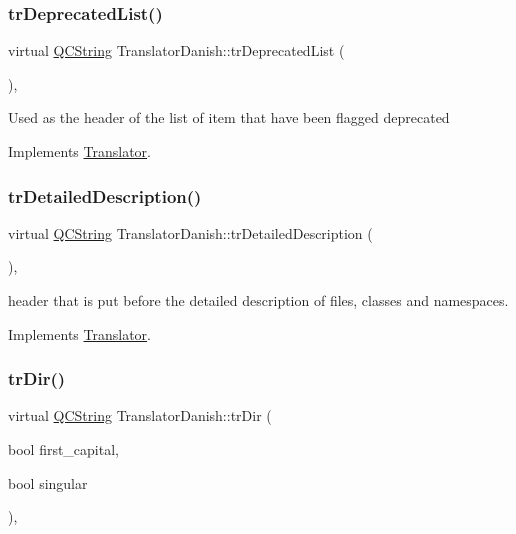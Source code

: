 \subsubsection{\texorpdfstring{trDeprecatedList()}{trDeprecatedList()}}
{\footnotesize\ttfamily virtual \mbox{\hyperlink{class_q_c_string}{Q\+C\+String}} Translator\+Danish\+::tr\+Deprecated\+List (\begin{DoxyParamCaption}{ }\end{DoxyParamCaption})\hspace{0.3cm}{\ttfamily [inline]}, {\ttfamily [virtual]}}

Used as the header of the list of item that have been flagged deprecated 

Implements \mbox{\hyperlink{class_translator}{Translator}}.

\mbox{\label{class_translator_danish_a7a7335e696d11478a7b2bb0a1fa24c54}} 
\subsubsection{\texorpdfstring{trDetailedDescription()}{trDetailedDescription()}}
{\footnotesize\ttfamily virtual \mbox{\hyperlink{class_q_c_string}{Q\+C\+String}} Translator\+Danish\+::tr\+Detailed\+Description (\begin{DoxyParamCaption}{ }\end{DoxyParamCaption})\hspace{0.3cm}{\ttfamily [inline]}, {\ttfamily [virtual]}}

header that is put before the detailed description of files, classes and namespaces. 

Implements \mbox{\hyperlink{class_translator}{Translator}}.

\mbox{\label{class_translator_danish_a3e5197e99dcf66474981d186f1b07939}} 
\subsubsection{\texorpdfstring{trDir()}{trDir()}}
{\footnotesize\ttfamily virtual \mbox{\hyperlink{class_q_c_string}{Q\+C\+String}} Translator\+Danish\+::tr\+Dir (\begin{DoxyParamCaption}\item[{bool}]{first\+\_\+capital,  }\item[{bool}]{singular }\end{DoxyParamCaption})\hspace{0.3cm}{\ttfamily [inline]}, {\ttfamily [virtual]}}

